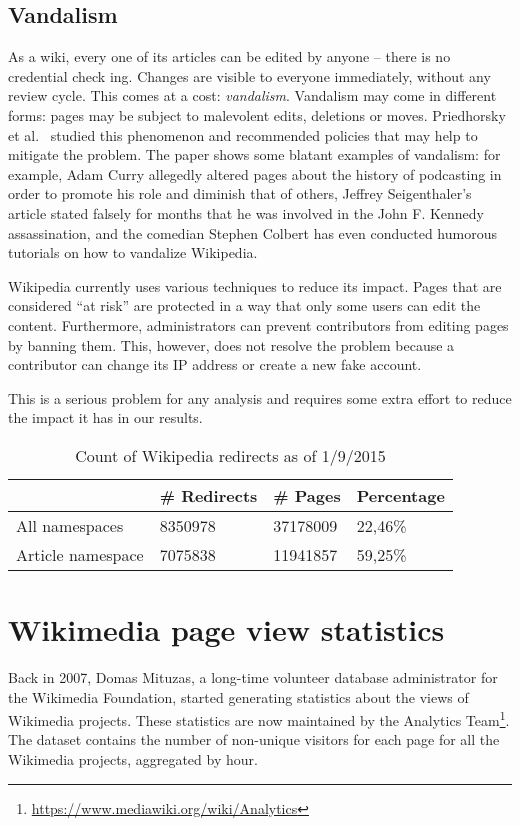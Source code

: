 \subsection{Vandalism}
As a wiki, every one of its articles can be edited by anyone – there is no credential check ing.
Changes are visible to everyone immediately, without any review cycle.
This comes at a cost: \emph{vandalism}.
Vandalism may come in different forms: pages may be subject to malevolent edits, deletions or moves.
Priedhorsky et al.~\cite{Priedhorsky2007} studied this phenomenon and recommended policies that may help to mitigate the problem.
The paper shows some blatant examples of vandalism: for example, Adam Curry allegedly altered pages about the history of podcasting in order to promote his role and diminish that of others, Jeffrey Seigenthaler's article stated falsely for months that he was involved in the John F. Kennedy assassination, and the comedian Stephen Colbert has even conducted humorous tutorials on how to vandalize Wikipedia.

Wikipedia currently uses various techniques to reduce its impact.
Pages that are considered ``at risk'' are protected in a way that only some users can edit the content.
Furthermore, administrators can prevent contributors from editing pages by banning them.
This, however, does not resolve the problem because a contributor can change its IP address or create a new fake account.

This is a serious problem for any analysis and requires some extra effort to reduce the impact it has in our results.

\begin{table}[]
\centering
\caption{Count of Wikipedia redirects as of 1/9/2015}
\label{tbl:redirects}
\begin{tabular}{llll}
\multicolumn{1}{c}{\textbf{}}          & \multicolumn{1}{c}{\textbf{\# Redirects}} & \multicolumn{1}{c}{\textbf{\# Pages}} & \textbf{Percentage} \\ \hline
\multicolumn{1}{l|}{All namespaces}    & 8350978                                & 37178009                               & 22,46\%             \\
\multicolumn{1}{l|}{Article namespace} & 7075838                                & 11941857                               & 59,25\%
\end{tabular}
\end{table}



\section{Wikimedia page view statistics}
\label{sec:pagecounts}
Back in 2007, Domas Mituzas, a long-time volunteer database administrator for the Wikimedia Foundation, started generating statistics about the views of Wikimedia projects.
These statistics are now maintained by the Analytics Team\footnote{\url{https://www.mediawiki.org/wiki/Analytics}}.
The dataset contains the number of non-unique visitors for each page for all the Wikimedia projects, aggregated by hour.

